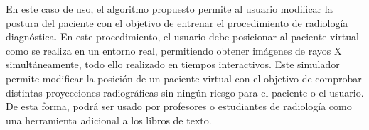 \begin{itemize}
\begin{itemize}
En este caso de uso, el algoritmo propuesto permite al usuario modificar la postura del paciente con el objetivo de entrenar el procedimiento de radiología diagnóstica. En este procedimiento, el usuario debe posicionar al paciente virtual como se realiza en un entorno real, permitiendo obtener imágenes de rayos X simultáneamente, todo ello realizado en tiempos interactivos. Este simulador permite modificar la posición de un paciente virtual con el objetivo de comprobar distintas proyecciones radiográficas sin ningún riesgo para el paciente o el usuario. De esta forma, podrá ser usado por profesores o estudiantes de radiología como una herramienta adicional a los libros de texto.
\end{itemize}

\end{itemize}





